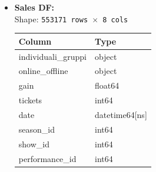 \documentclass[a4paper,12pt]{report}  %
\begin{document}
\begin{itemize}
  \item \textbf{Sales DF:}\\[-0.5ex]
        Shape: \texttt{553171 rows $\times$ 8 cols}\\[1ex]
        \begin{tabular}{@{}ll@{}}
          \toprule
          \textbf{Column}            & \textbf{Type}     \\
          \midrule
          individuali\_gruppi        & object            \\
          online\_offline            & object            \\
          gain                       & float64           \\
          tickets                    & int64             \\
          date                       & datetime64[ns]    \\
          season\_id                 & int64             \\
          show\_id                   & int64             \\
          performance\_id            & int64             \\
          \bottomrule
        \end{tabular}


\end{itemize}
\end{document}
